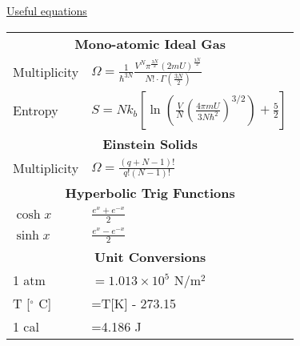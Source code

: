 \begin{multicols}{2}
\begin{minipage}{\columnwidth}
\centering\underline{Useful equations}
\renewcommand{\arraystretch}{2.5}
\begin{tabular}{ll}
	\multicolumn{2}{c}{\textbf{Mono-atomic Ideal Gas}}\\
	Multiplicity & $\Omega=\frac{1}{\hbar^{3N}}\frac{V^N\pi^{\frac{3N}{2}}\left(2mU\right)^\frac{3N}{2}}{N!\cdot\Gamma(\frac{3N}{2})}$\\
	Entropy & $S=Nk_b\left[\ln\left(\frac{V}{N}\left(\frac{4\pi mU}{3N\hbar^2}\right)^{3/2}\right)+\frac{5}{2}\right]$\\
	\multicolumn{2}{c}{\textbf{Einstein Solids}}\\
	Multiplicity & $\Omega=\frac{\left(q+N-1\right)!}{q!\left(N-1\right)!}$\\
	\multicolumn{2}{c}{\textbf{Hyperbolic Trig Functions}}\\
	$\cosh{x}$ & $\frac{e^x+e^{-x}}{2}$\\
	$\sinh{x}$ & $\frac{e^x-e^{-x}}{2}$\\
	\multicolumn{2}{c}{\textbf{Unit Conversions}}\\
	1 atm & $=1.013\times10^5$ N/m$^2$\\
	T [$^\circ$ C] & =T[K] - 273.15\\
	1 cal&=4.186 J\\
\end{tabular}
\end{minipage}

\end{multicols}